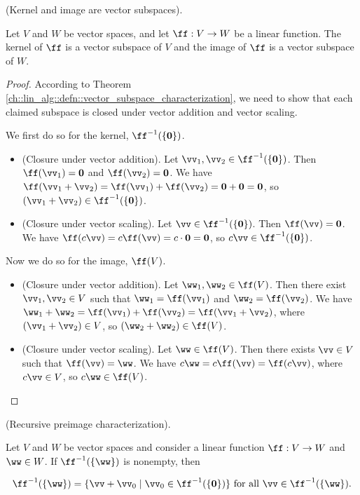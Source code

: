 \begin{theorem}
    (Kernel and image are vector subspaces). 
    
    Let $V$ and $W$ be vector spaces, and let $\ff:V \rightarrow W$ be a linear function. The kernel of $\ff$ is a vector subspace of $V$ and the image of $\ff$ is a vector subspace of $W$.
\end{theorem}

\begin{proof}
    According to Theorem \ref{ch::lin_alg::defn::vector_subspace_characterization}, we need to show that each claimed subspace is closed under vector addition and vector scaling.

    We first do so for the kernel, $\ff^{-1}(\{\mathbf{0}\})$.
    \begin{itemize}
        \item (Closure under vector addition). Let $\vv_1, \vv_2 \in \ff^{-1}(\{\mathbf{0}\})$. Then $\ff(\vv_1) = \mathbf{0}$ and $\ff(\vv_2) = \mathbf{0}$. We have $\ff(\vv_1 + \vv_2) =\ff(\vv_1) + \ff(\vv_2) = \mathbf{0} + \mathbf{0} = \mathbf{0}$, so $(\vv_1 + \vv_2) \in \ff^{-1}(\{\mathbf{0}\})$.        
        \item (Closure under vector scaling). Let $\vv \in \ff^{-1}(\{\mathbf{0}\})$. Then $\ff(\vv) = \mathbf{0}$. We have $\ff(c\vv) = c\ff(\vv) = c\cdot \mathbf{0} = \mathbf{0}$, so $c\vv \in \ff^{-1}(\{\mathbf{0}\})$.
    \end{itemize}

    Now we do so for the image, $\ff(V)$.
    \begin{itemize}
        \item (Closure under vector addition). Let $\ww_1, \ww_2 \in \ff(V)$. Then there exist $\vv_1, \vv_2 \in V$ such that $\ww_1 = \ff(\vv_1)$ and $\ww_2 = \ff(\vv_2)$. We have $\ww_1 + \ww_2 = \ff(\vv_1) + \ff(\vv_2) = \ff(\vv_1 + \vv_2)$, where $(\vv_1 + \vv_2) \in V$, so $(\ww_2 + \ww_2) \in \ff(V)$.
        \item (Closure under vector scaling). Let $\ww \in \ff(V)$. Then there exists $\vv \in V$ such that $\ff(\vv) = \ww$. We have $c\ww = c\ff(\vv) = \ff(c\vv)$, where $c\vv \in V$, so $c\ww \in \ff(V)$.
    \end{itemize}
\end{proof}

\begin{theorem}
\label{ch::lin_alg::thm::recursive_preimage_char}
    (Recursive preimage characterization).

    Let $V$ and $W$ be vector spaces and consider a linear function $\ff:V \rightarrow W$ and $\ww \in W$. If $\ff^{-1}(\{\ww\})$ is nonempty, then 

    \begin{align*}
        \ff^{-1}(\{\ww\}) = \{\vv + \vv_0 \mid \vv_0 \in \ff^{-1}(\{\mathbf{0}\})\} \text{ for all $\vv \in \ff^{-1}(\{\ww\})$}.
    \end{align*}
\end{theorem}

